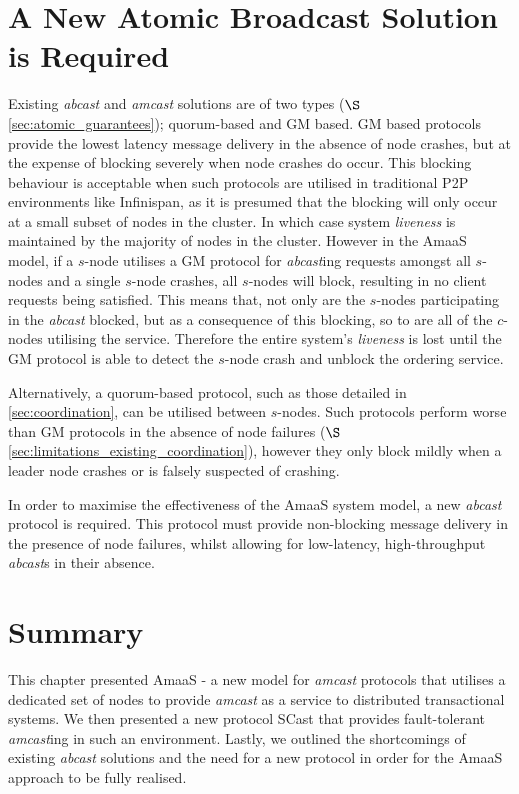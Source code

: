 \section{A New Atomic Broadcast Solution is Required}
Existing \emph{abcast} and \emph{amcast} solutions are of two types ($\S$ \ref{sec:atomic_guarantees}); quorum-based and GM based.  GM based protocols provide the lowest latency message delivery in the absence of node crashes, but at the expense of blocking severely when node crashes do occur.  This blocking behaviour is acceptable when such protocols are utilised in traditional P2P environments like Infinispan, as it is presumed that the blocking will only occur at a small subset of nodes in the cluster.  In which case system \emph{liveness} is maintained by the majority of nodes in the cluster.  However in the \textsf{AmaaS} model, if a $s$-node utilises a GM protocol for \emph{abcast}ing requests amongst all $s$-nodes and a single $s$-node crashes, all $s$-nodes will block, resulting in no client requests being satisfied. This means that, not only are the $s$-nodes participating in the \emph{abcast} blocked, but as a consequence of this blocking, so to are all of the $c$-nodes utilising the service.  Therefore the entire system's \emph{liveness} is lost until the GM protocol is able to detect the $s$-node crash and unblock the ordering service.  

Alternatively, a quorum-based protocol, such as those detailed in \ref{sec:coordination}, can be utilised between $s$-nodes.  Such protocols perform worse than GM protocols in the absence of node failures ($\S$ \ref{sec:limitations_existing_coordination}), however they only block mildly when a leader node crashes or is falsely suspected of crashing.  

In order to maximise the effectiveness of the \textsf{AmaaS} system model, a new \emph{abcast} protocol is required.  This protocol must provide non-blocking message delivery in the presence of node failures, whilst allowing for low-latency, high-throughput \emph{abcast}s in their absence.  

\section{Summary}
This chapter presented \textsf{AmaaS} - a new model for \emph{amcast} protocols that utilises a dedicated set of nodes to provide \emph{amcast} as a service to distributed transactional systems.  We then presented a new protocol \textsf{SCast} that provides fault-tolerant \emph{amcast}ing in such an environment.  Lastly, we outlined the shortcomings of existing \emph{abcast} solutions and the need for a new protocol in order for the \textsf{AmaaS} approach to be fully realised. 